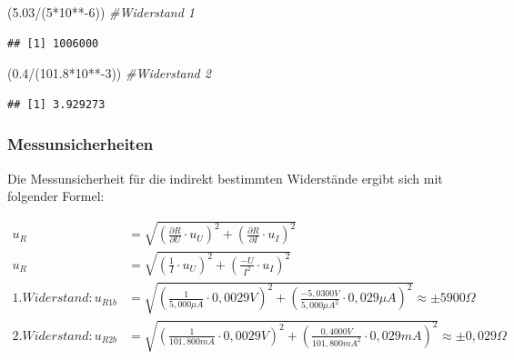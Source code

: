 \documentclass[
  9pt,
]{article}
\newenvironment{Shaded}{\begin{snugshade}}{\end{snugshade}}
\newcommand{\CommentTok}[1]{\textcolor[rgb]{0.56,0.35,0.01}{\textit{#1}}}
\newcommand{\DecValTok}[1]{\textcolor[rgb]{0.00,0.00,0.81}{#1}}
\newcommand{\FloatTok}[1]{\textcolor[rgb]{0.00,0.00,0.81}{#1}}
\newcommand{\NormalTok}[1]{#1}
\newcommand{\SpecialCharTok}[1]{\textcolor[rgb]{0.00,0.00,0.00}{#1}}
\begin{document}
\begin{Shaded}
\begin{Highlighting}[]
\NormalTok{(}\FloatTok{5.03}\SpecialCharTok{/}\NormalTok{(}\DecValTok{5}\SpecialCharTok{*}\DecValTok{10}\SpecialCharTok{**{-}}\DecValTok{6}\NormalTok{)) }\CommentTok{\#Widerstand 1}
\end{Highlighting}
\end{Shaded}

\begin{verbatim}
## [1] 1006000
\end{verbatim}

\begin{Shaded}
\begin{Highlighting}[]
\NormalTok{(}\FloatTok{0.4}\SpecialCharTok{/}\NormalTok{(}\FloatTok{101.8}\SpecialCharTok{*}\DecValTok{10}\SpecialCharTok{**{-}}\DecValTok{3}\NormalTok{)) }\CommentTok{\#Widerstand 2}
\end{Highlighting}
\end{Shaded}

\begin{verbatim}
## [1] 3.929273
\end{verbatim}

\hypertarget{messunsicherheiten-1}{%
\subsubsection{Messunsicherheiten}\label{messunsicherheiten-1}}

Die Messunsicherheit für die indirekt bestimmten Widerstände ergibt sich
mit folgender Formel:

\begin {equation*}
\begin{split}
u_R &= \sqrt{\left (\frac{\partial R}{\partial U} \cdot u_U\right )^2 + \left (\frac{\partial R}{\partial I} \cdot u_I\right )^2 } \\
u_R &= \sqrt{\left (\frac{1}{I} \cdot u_U\right )^2 + \left (\frac{-U}{I^2} \cdot u_I\right )^2 } \\
1.Widerstand: u_{R1b}&= \sqrt{\left (\frac{1}{5,000\mu A} \cdot 0,0029V\right )^2 + \left (\frac{-5,0300V}{5,000\mu A^2} \cdot 0,029 \mu A\right )^2 } \approx \pm 5900\Omega \\
2.Widerstand: u_{R2b}&= \sqrt{\left (\frac{1}{101,800mA} \cdot 0,0029V \right )^2 + \left (\frac{0,4000V}{101,800mA^2} \cdot 0,029mA\right )^2 } \approx \pm 0,029\Omega
\end{split}
\end{equation*}
\end{document}
